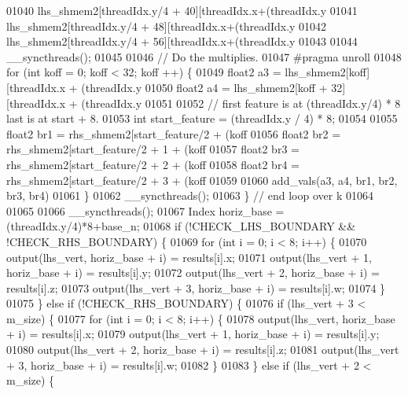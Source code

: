 \begin{DoxyCode}
01040     lhs\_shmem2[threadIdx.y/4 + 40][threadIdx.x+(threadIdx.y%
01041     lhs\_shmem2[threadIdx.y/4 + 48][threadIdx.x+(threadIdx.y%
01042     lhs\_shmem2[threadIdx.y/4 + 56][threadIdx.x+(threadIdx.y%
01043 
01044     \_\_syncthreads();
01045 
01046     \textcolor{comment}{// Do the multiplies.}
01047 \textcolor{preprocessor}{    #pragma unroll}
01048     \textcolor{keywordflow}{for} (\textcolor{keywordtype}{int} koff = 0; koff < 32; koff ++) \{
01049       float2 a3 = lhs\_shmem2[koff][threadIdx.x + (threadIdx.y %
01050       float2 a4 = lhs\_shmem2[koff + 32][threadIdx.x + (threadIdx.y %
01051 
01052       \textcolor{comment}{// first feature is at (threadIdx.y/4) * 8 last is at start + 8.}
01053       \textcolor{keywordtype}{int} start\_feature = (threadIdx.y / 4) * 8;
01054 
01055       float2 br1 = rhs\_shmem2[start\_feature/2 +     (koff %
01056       float2 br2 = rhs\_shmem2[start\_feature/2 + 1 + (koff %
01057       float2 br3 = rhs\_shmem2[start\_feature/2 + 2 + (koff %
01058       float2 br4 = rhs\_shmem2[start\_feature/2 + 3 + (koff %
01059 
01060       add\_vals(a3, a4, br1, br2, br3, br4)
01061     \}
01062     \_\_syncthreads();
01063   \} \textcolor{comment}{// end loop over k}
01064 
01065 
01066   \_\_syncthreads();
01067   Index horiz\_base = (threadIdx.y/4)*8+base\_n;
01068   \textcolor{keywordflow}{if} (!CHECK\_LHS\_BOUNDARY && !CHECK\_RHS\_BOUNDARY) \{
01069     \textcolor{keywordflow}{for} (\textcolor{keywordtype}{int} i = 0; i < 8; i++) \{
01070       output(lhs\_vert, horiz\_base + i) = results[i].x;
01071       output(lhs\_vert + 1, horiz\_base + i) = results[i].y;
01072       output(lhs\_vert + 2, horiz\_base + i) = results[i].z;
01073       output(lhs\_vert + 3, horiz\_base + i) = results[i].w;
01074     \}
01075   \} \textcolor{keywordflow}{else} \textcolor{keywordflow}{if} (!CHECK\_RHS\_BOUNDARY) \{
01076     \textcolor{keywordflow}{if} (lhs\_vert + 3 < m\_size) \{
01077       \textcolor{keywordflow}{for} (\textcolor{keywordtype}{int} i = 0; i < 8; i++) \{
01078         output(lhs\_vert, horiz\_base + i) = results[i].x;
01079         output(lhs\_vert + 1, horiz\_base + i) = results[i].y;
01080         output(lhs\_vert + 2, horiz\_base + i) = results[i].z;
01081         output(lhs\_vert + 3, horiz\_base + i) = results[i].w;
01082       \}
01083     \} \textcolor{keywordflow}{else} \textcolor{keywordflow}{if} (lhs\_vert + 2 < m\_size) \{

\end{DoxyCode}
